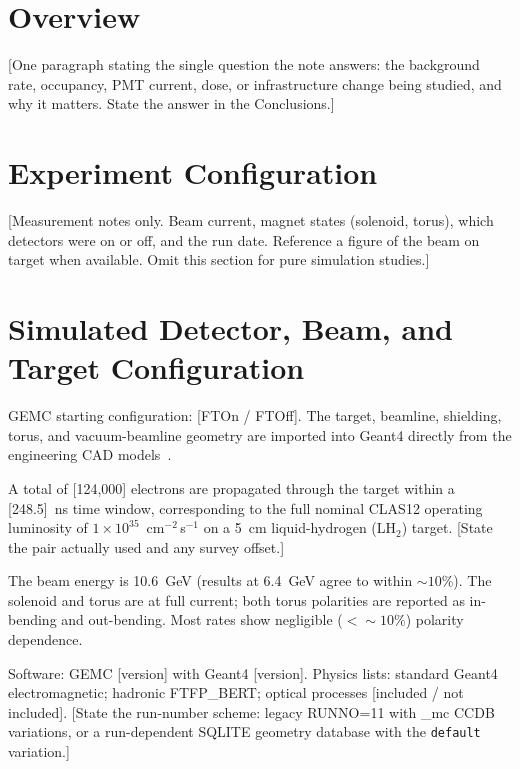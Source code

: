 %

\section*{Overview}
[One paragraph stating the single question the note answers: the background rate,
occupancy, PMT current, dose, or infrastructure change being studied, and why it
matters. State the answer in the Conclusions.]

\section{Experiment Configuration}
[Measurement notes only. Beam current, magnet states (solenoid, torus), which
detectors were on or off, and the run date. Reference a figure of the beam on
target when available. Omit this section for pure simulation studies.]

\section{Simulated Detector, Beam, and Target Configuration}
GEMC starting configuration: [FTOn / FTOff]. The target, beamline, shielding,
torus, and vacuum-beamline geometry are imported into Geant4 directly from the
engineering CAD models~\cite{note:cad,note:moller,note:beamline,note:target}.

A total of [124{,}000] electrons are propagated through the target within a
[248.5]~ns time window, corresponding to the full nominal CLAS12 operating
luminosity of $1\times10^{35}$~cm$^{-2}$\,s$^{-1}$ on a 5~cm liquid-hydrogen
(LH$_2$) target. [State the pair actually used and any survey offset.]

The beam energy is 10.6~GeV (results at 6.4~GeV agree to within ${\sim}10\%$).
The solenoid and torus are at full current; both torus polarities are reported as
in-bending and out-bending. Most rates show negligible (${<}{\sim}10\%$)
polarity dependence.

Software: GEMC [version] with Geant4 [version]. Physics lists: standard Geant4
electromagnetic; hadronic FTFP\_BERT; optical processes [included / not included].
[State the run-number scheme: legacy RUNNO=11 with \_mc CCDB variations, or a
run-dependent SQLITE geometry database with the \texttt{default} variation.]
